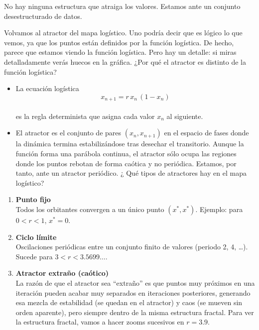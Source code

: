 \documentclass[
  10pt,
  a4paper,
  DIV=11,
  numbers=noendperiod,
  open=any]{scrreprt}
\providecommand{\tightlist}{%
  \setlength{\itemsep}{0pt}\setlength{\parskip}{0pt}}
\numberwithin{equation}{chapter}
\numberwithin{equation}{section}
\renewcommand{\[}{\begin{equation}}
\renewcommand{\]}{\end{equation}}
\begin{document}
No hay ninguna estructura que atraiga los valores. Estamos ante un
conjunto desestructurado de datos.

Volvamos al atractor del mapa logístico. Uno podría decir que es lógico
lo que vemos, ya que los puntos están definidos por la función
logística. De hecho, parece que estamos viendo la función logística.
Pero hay un detalle: si miras detalladamente verás huecos en la gráfica.
¿Por qué el atractor es distinto de la función logística?

\begin{itemize}
\tightlist
\item
  La ecuación logística\\
  \[
  x_{n+1} = r\,x_n\,(1 - x_n)
  \]\\
  es la regla determinista que asigna cada valor \(x_n\) al siguiente.
\item
  El atractor es el conjunto de pares \((x_n, x_{n+1})\) en el espacio
  de fases donde la dinámica termina estabilizándose tras desechar el
  transitorio. Aunque la función forma una parábola continua, el
  atractor sólo ocupa las regiones donde los puntos rebotan de forma
  caótica y no periódica. Estamos, por tanto, ante un atractor
  periódico. ¿ Qué tipos de atractores hay en el mapa logístico?
\end{itemize}

\begin{enumerate}
\def\labelenumi{\arabic{enumi}.}
\item
  \textbf{Punto fijo}\\
  Todos los orbitantes convergen a un único punto \((x^*,x^*)\).
  Ejemplo: para \(0 < r < 1\), \(x^* = 0\).
\item
  \textbf{Ciclo límite}\\
  Oscilaciones periódicas entre un conjunto finito de valores (periodo
  2, 4, \ldots). Sucede para \(3 < r < 3.5699\ldots\).
\item
  \textbf{Atractor extraño (caótico)}\\
  La razón de que el atractor sea ``extraño'' es que puntos muy próximos
  en una iteración pueden acabar muy separados en iteraciones
  posteriores, generando esa mezcla de estabilidad (se quedan en el
  atractor) y caos (se mueven sin orden aparente), pero siempre dentro
  de la misma estructura fractal. Para ver la estructura fractal, vamos
  a hacer zooms sucesivos en \(r = 3.9\).
\end{enumerate}
\end{document}

